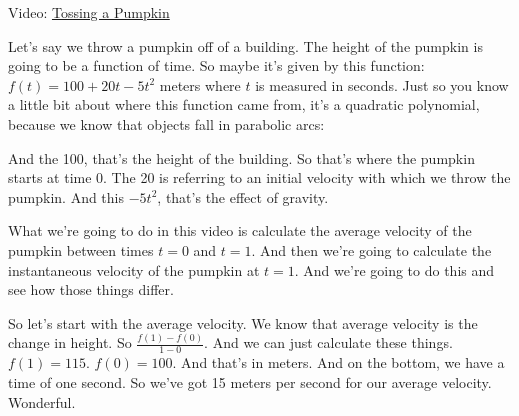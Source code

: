 \documentclass[pdftex, brazil, 12pt, twoside]{article}
\begin{document}
Video: \href{https://www.youtube.com/watch?v=wGlonwfSO5Q}{Tossing a Pumpkin}

Let's say we throw a pumpkin off of a building.
The height of the pumpkin is going to be a function of time.
So maybe it's given by this function:
$\displaystyle f(t) = 100 + 20t - 5t^2$ meters where
$t$ is measured in seconds.
Just so you know a little bit about where this function came
from, it's a quadratic polynomial,
because we know that objects fall in parabolic arcs:

\begin{figure}[H]
  \begin{center}
  \end{center}
\end{figure}

And the 100, that's the height of the building.
So that's where the pumpkin starts at time 0.
The 20 is referring to an initial velocity with which we
throw the pumpkin.
And this $-5t^2$, that's the effect of gravity.

What we're going to do in this video is calculate
the average velocity of the pumpkin between times
$t = 0$ and $t = 1$.
And then we're going to calculate
the instantaneous velocity of the pumpkin at $t = 1$.
And we're going to do this and see how those things differ.

So let's start with the average velocity.
We know that average velocity is the change in height.
So $\displaystyle \frac{f(1) - f(0)}{1 - 0}$.
And we can just calculate these things. $f(1) = 115$.
$f(0) = 100$. And that's in meters.
And on the bottom, we have a time of one second.
So we've got 15 meters per second
for our average velocity.
Wonderful.
\end{document}
